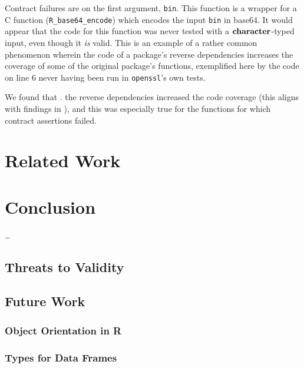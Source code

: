 \documentclass[acmsmall,review,anonymous]{acmart}\settopmatter{printfolios=true,printccs=false,printacmref=false}
\newcommand{\code}[1]{{\lstinline[style=Rin]!#1!}\xspace}
\begin{document}
Contract failures are on the first argument, \code{bin}.
This function is a wrapper for a C function (\code{R_base64_encode}) which encodes the input \code{bin} in base64.
It would appear that the code for this function was never tested with a ${\bf character}$-typed input, even though it {\it is} valid.
This is an example of a rather common phenomenon wherein the code of a package's reverse dependencies increases the coverage of some of the original package's functions, exemplified here by the code on line 6 never having been run in \code{openssl}'s own tests.

We found that . the reverse dependencies increased the code coverage (this aligns with findings in ), and this was especially true for the functions for which contract assertions failed.

%
%
%
%
%
%
\section{Related Work}
\label{sec:relatedwork}


%
%
%
%
%
%
\section{Conclusion}

\ldots

%
%
%
%
\subsection{Threats to Validity}

%
%
%
%
\subsection{Future Work}

%
%
\subsubsection{Object Orientation in R}

%
%
\subsubsection{Types for Data Frames}

%
%
%


\end{document}

